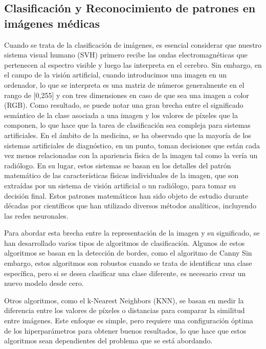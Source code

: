 \subsection*{Clasificación y Reconocimiento de patrones en imágenes médicas}  

Cuando se trata de la clasificación de imágenes, es esencial considerar que nuestro sistema visual humano (SVH) primero recibe las ondas electromagnéticas que pertenecen al espectro visible y luego las interpreta en el cerebro. Sin embargo, en el campo de la visión artificial, cuando introducimos una imagen en un ordenador, lo que se interpreta es una matriz de números generalmente en el rango de [0,255] y con tres dimensiones en caso de que sea una imagen a color (RGB). Como resultado, se puede notar una gran brecha entre el significado semántico de la clase asociada a una imagen y los valores de píxeles que la componen, lo que hace que la tarea de clasificación sea compleja para sistemas artificiales. En el ámbito de la medicina, se ha observado que la mayoría de los sistemas artificiales de diagnóstico, en un punto, toman decisiones que están cada vez menos relacionadas con la apariencia física de la imagen tal como la vería un radiólogo. En su lugar, estos sistemas se basan en los detalles del patrón matemático de las características físicas individuales de la imagen, que son extraídas por un sistema de visión artificial o un radiólogo, para tomar su decisión final. Estos patrones matemáticos han sido objeto de estudio durante décadas por científicos que han utilizado diversos métodos analíticos, incluyendo las redes neuronales. %

Para abordar esta brecha entre la representación de la imagen y su significado, se han desarrollado varios tipos de algoritmos de clasificación. Algunos de estos algoritmos se basan en la detección de bordes, como el algoritmo de Canny %
Sin embargo, estos algoritmos son robustos cuando se trata de identificar una clase específica, pero si se desea clasificar una clase diferente, es necesario crear un nuevo modelo desde cero.

Otros algoritmos, como el k-Nearest Neighbors (KNN), se basan en medir la diferencia entre los valores de píxeles o distancias para comparar la similitud entre imágenes. Este enfoque es simple, pero requiere una configuración óptima de los hiperparámetros para obtener buenos resultados, lo que hace que estos algoritmos sean dependientes del problema que se está abordando.

